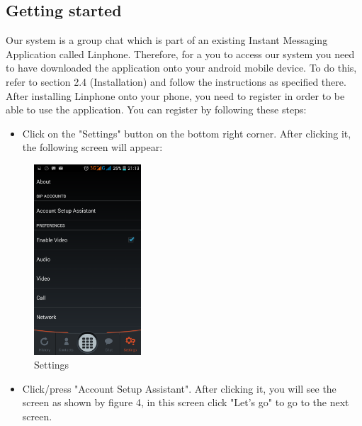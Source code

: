\documentclass[a4paper]{article}
\begin{document}
\subsection{Getting started}
Our system is a group chat which is part of an existing Instant Messaging Application called Linphone. Therefore, for a you to access our system you need to have downloaded the application onto your android mobile device. To do this,  refer to section 2.4 (Installation) and follow the instructions as specified there. After installing Linphone onto your phone, you need to register in order to be able to use the application.
You can register by following these steps:
\begin{itemize}
\item Click on the "Settings" button on the bottom right corner. After clicking it, the following screen will appear:
\end{itemize}

\begin{figure}[h]
\centering
\includegraphics[scale=0.30, width=40mm]{./pictures/settings.png}
\caption{\label{fig:Agile}Settings}
\end{figure}

\begin{itemize}
\item Click/press "Account Setup Assistant".  After clicking it, you will see the screen as shown by figure 4, in this screen click "Let's go" to go to the next screen.
\end{itemize}
\end{document}
